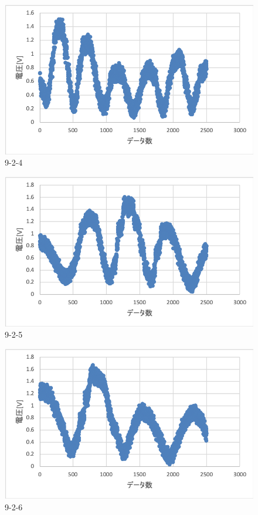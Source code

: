 \documentclass[11pt, a4paper,twocolumn]{jarticle}
\begin{document}
\begin{figure}[ht]
 \begin{center}
  \includegraphics[width=0.8\linewidth]{fig19.png}
 \end{center}
 \caption{9-2-4}
 \label{fig:19}
\end{figure}

\begin{figure}[ht]
 \begin{center}
  \includegraphics[width=0.8\linewidth]{fig20.png}
 \end{center}
 \caption{9-2-5}
 \label{fig:20}
\end{figure}

\begin{figure}[ht]
 \begin{center}
  \includegraphics[width=0.8\linewidth]{fig21.png}
 \end{center}
 \caption{9-2-6}
 \label{fig:21}
\end{figure}
\end{document}
